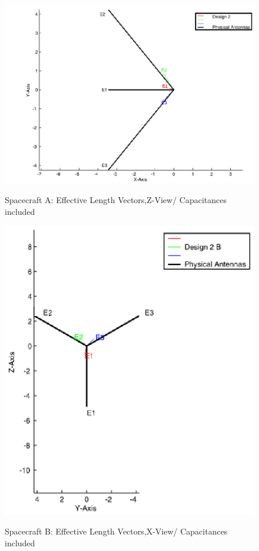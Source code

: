 \documentclass[a4paper,10pt]{thesis}
\begin{document}
\begin{figure}
        \begin{center}
        \includegraphics[width=12cm]{HeffD2HGA0-500kHz-ZViewCap.eps}\\
        \caption{Spacecraft A: Effective Length Vectors,Z-View/ Capacitances included}\label{fig_Heff_D2_A_Z_ViewCap}
    \end{center}
\end{figure}

\begin{figure}
  \begin{center}
    \includegraphics[width=12cm]{HeffD2HGA0-500kHz-XViewCap_B.eps}\\
    \caption{Spacecraft B: Effective Length Vectors,X-View/ Capacitances included}\label{fig_Heff_D2_B_X_ViewCap}
  \end{center}
\end{figure}
\end{document}
